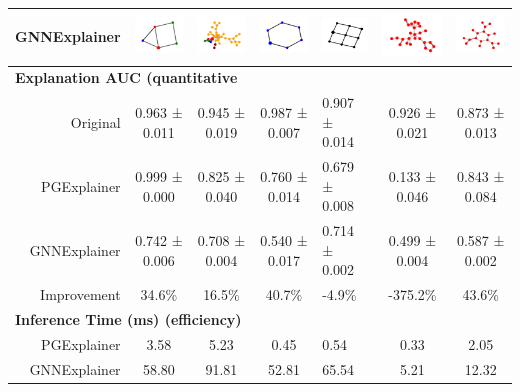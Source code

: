 \begin{table}[h!]
{\begin{tabular}{rcccccc}
GNNExplainer &  \includegraphics[width=.1\linewidth]{../openreview/imgs/simplification/syn1_gnn.png}
& \includegraphics[width=.1\linewidth]{../openreview/imgs/simplification/syn2_gnn.png} & \includegraphics[width=.1\linewidth]{../openreview/imgs/simplification/syn3_gnn.png} & \multicolumn{1}{l|}{\includegraphics[width=.1\linewidth]{../openreview/imgs/simplification/syn4_gnn.png}} & \includegraphics[width=.1\linewidth]{../openreview/imgs/simplification/ba_gnn.png} & \includegraphics[width=.1\linewidth]{../openreview/imgs/simplification/mutag_gnn.png} \\\hline
\multicolumn{7}{l}{\textbf{Explanation AUC (quantitative}} \\ \hline
Original & 0.963 ± 0.011 & 0.945 ± 0.019 & 0.987 ± 0.007 & \multicolumn{1}{l|}{0.907 ± 0.014} & 0.926 ± 0.021 & 0.873 ± 0.013 \\ 
PGExplainer & 0.999 ± 0.000 & 0.825 ± 0.040 & 0.760 ± 0.014 & \multicolumn{1}{l|}{0.679 ± 0.008} & 0.133 ± 0.046 & 0.843 ± 0.084 \\ 
GNNExplainer & 0.742 ± 0.006 & 0.708 ± 0.004 & 0.540 ± 0.017 & \multicolumn{1}{l|}{0.714 ± 0.002} & 0.499 ± 0.004 & 0.587 ± 0.002 \\ 
Improvement & 34.6\% & 16.5\% & 40.7\% & \multicolumn{1}{l|}{-4.9\%} & -375.2\% & 43.6\% \\ \hline
\multicolumn{7}{l}{\textbf{Inference Time (ms) (efficiency)}} \\ \hline
PGExplainer & 3.58 & 5.23 & 0.45 & \multicolumn{1}{l|}{0.54} & 0.33 & 2.05 \\
GNNExplainer & 58.80 & 91.81 & 52.81 & \multicolumn{1}{l|}{65.54} & 5.21 & 12.32 \\

\end{tabular}}
\end{table}
